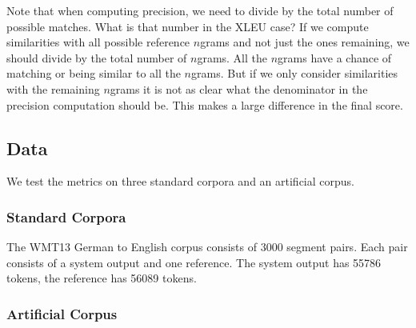Note that when computing precision, we need to divide by the total number of possible matches. 
What is that number in the XLEU case?
If we compute similarities with all possible reference $n$grams and not just the ones remaining, we should divide by the total number of $n$grams. 
All the $n$grams have a chance of matching or being similar to all the $n$grams. 
But if we only consider similarities with the remaining $n$grams it is not as clear what the denominator in the precision computation should be. 
This makes a large difference in the final score. 




\subsection{Data}
\label{sec:data}


We test the metrics on three standard corpora and an artificial corpus.

\subsubsection{Standard Corpora}
\label{sec:standardcorp}

The WMT13 German to English corpus consists of $3000$ segment pairs. 
Each pair consists of a system output and one reference. 
The system output has 55786 tokens, the reference has 56089 tokens. 

\subsubsection{Artificial Corpus}
\label{sec:artificial}

